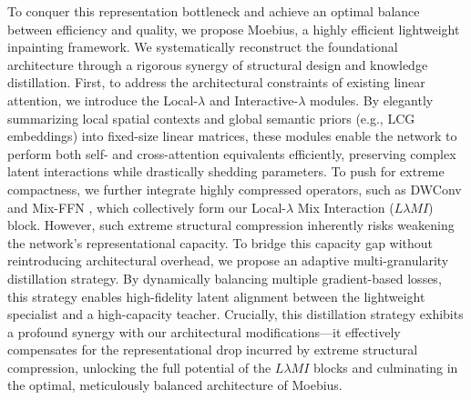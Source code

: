\documentclass{llmxive}
\begin{document}
\vspace{-0.5em}
To conquer this representation bottleneck and achieve an optimal balance between efficiency and quality, we propose Moebius, a highly efficient lightweight inpainting framework. We systematically reconstruct the foundational architecture through a rigorous synergy of structural design and knowledge distillation. First, to address the architectural constraints of existing linear attention, we introduce the Local-$\lambda$ and Interactive-$\lambda$ modules. By elegantly summarizing local spatial contexts and global semantic priors (e.g., LCG embeddings) into fixed-size linear matrices, these modules enable the network to perform both self- and cross-attention equivalents efficiently, preserving complex latent interactions while drastically shedding parameters. To push for extreme compactness, we further integrate highly compressed operators, such as DWConv and Mix-FFN \cite{xie2024sana, xie2025sana}, which collectively form our Local-$\lambda$ Mix Interaction ($L\lambda MI$) block. However, such extreme structural compression inherently risks weakening the network's representational capacity. To bridge this capacity gap without reintroducing architectural overhead, we propose an adaptive multi-granularity distillation strategy. By dynamically balancing multiple gradient-based losses, this strategy enables high-fidelity latent alignment between the lightweight specialist and a high-capacity teacher. Crucially, this distillation strategy exhibits a profound synergy with our architectural modifications—it effectively compensates for the representational drop incurred by extreme structural compression, unlocking the full potential of the $L\lambda MI$ blocks and culminating in the optimal, meticulously balanced architecture of Moebius.
\end{document}
